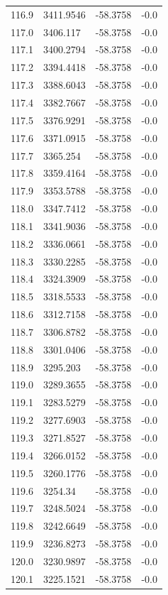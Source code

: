 \begin{table}[H]
\begin{tabular}{llll}
116.9 & 3411.9546 & -58.3758 & -0.0 \\
117.0 & 3406.117 & -58.3758 & -0.0 \\
117.1 & 3400.2794 & -58.3758 & -0.0 \\
117.2 & 3394.4418 & -58.3758 & -0.0 \\
117.3 & 3388.6043 & -58.3758 & -0.0 \\
117.4 & 3382.7667 & -58.3758 & -0.0 \\
117.5 & 3376.9291 & -58.3758 & -0.0 \\
117.6 & 3371.0915 & -58.3758 & -0.0 \\
117.7 & 3365.254 & -58.3758 & -0.0 \\
117.8 & 3359.4164 & -58.3758 & -0.0 \\
117.9 & 3353.5788 & -58.3758 & -0.0 \\
118.0 & 3347.7412 & -58.3758 & -0.0 \\
118.1 & 3341.9036 & -58.3758 & -0.0 \\
118.2 & 3336.0661 & -58.3758 & -0.0 \\
118.3 & 3330.2285 & -58.3758 & -0.0 \\
118.4 & 3324.3909 & -58.3758 & -0.0 \\
118.5 & 3318.5533 & -58.3758 & -0.0 \\
118.6 & 3312.7158 & -58.3758 & -0.0 \\
118.7 & 3306.8782 & -58.3758 & -0.0 \\
118.8 & 3301.0406 & -58.3758 & -0.0 \\
118.9 & 3295.203 & -58.3758 & -0.0 \\
119.0 & 3289.3655 & -58.3758 & -0.0 \\
119.1 & 3283.5279 & -58.3758 & -0.0 \\
119.2 & 3277.6903 & -58.3758 & -0.0 \\
119.3 & 3271.8527 & -58.3758 & -0.0 \\
119.4 & 3266.0152 & -58.3758 & -0.0 \\
119.5 & 3260.1776 & -58.3758 & -0.0 \\
119.6 & 3254.34 & -58.3758 & -0.0 \\
119.7 & 3248.5024 & -58.3758 & -0.0 \\
119.8 & 3242.6649 & -58.3758 & -0.0 \\
119.9 & 3236.8273 & -58.3758 & -0.0 \\
120.0 & 3230.9897 & -58.3758 & -0.0 \\
120.1 & 3225.1521 & -58.3758 & -0.0 \\

\end{tabular}
\end{table}
